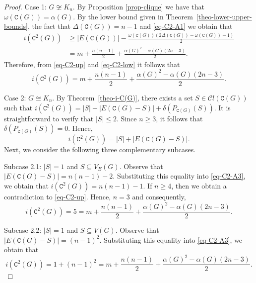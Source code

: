 \documentclass[10pt,a4paper]{amsart}
\begin{document}
\begin{proof}
\noindent
Case 1: $G\not\cong K_n$. By Proposition \ref{prop-clique} we have that $\omega (\mathtt{C}(G)) = \alpha(G)$. By the lower bound given in Theorem~\ref{theo-lower-upper-bounds}, the fact that $\Delta(\mathtt{C}(G)) = n-1$ and \eqref{eq-C2-A1} we obtain that
\begin{equation}\label{eq-C2-low}
\begin{split}
i (\mathtt{C}^{2}(G)) &\geq |E(\mathtt{C}(G))| - \frac{\omega(\mathtt{C}(G))(2\Delta(\mathtt{C}(G))- \omega(\mathtt{C}(G)) -1 )} {2} \\[6pt]
&= m + \frac{n(n-1)}{2} + \frac{\alpha(G)^{2} - \alpha(G) (2n-3)}{2}.
\end{split}
\end{equation}
Therefore, from \eqref{eq-C2-up} and \eqref{eq-C2-low} it follows that
$$i (\mathtt{C}^{2}(G)) = m + \frac{n(n-1)}{2} + \frac{\alpha(G)^{2} - \alpha(G) (2n-3)}{2}.$$

\vspace{.2cm}

\noindent
Case 2: $G \cong K_n$. By Theorem~\ref{theo-i-C(G)}, there exists a set $S \in \mathcal{C}l (\mathtt{C}(G))$ such that 
$i(\mathtt{C}^{2}(G)) = |S| + |E(\mathtt{C}(G)-S)| + \delta(P_{\mathtt{C}(G)}(S))$. It is straightforward to verify that $|S|\leq 2$. Since $n\geq 3$, it follows that $\delta(P_{\mathtt{C}(G)}(S)) = 0$. Hence,
\begin{equation}\label{eq-C2-A3}
i(\mathtt{C}^{2}(G)) = |S| + |E(\mathtt{C}(G)-S)|.
\end{equation}
Next, we consider the following three complementary subcases.

\vspace{.2cm}
		
\noindent
Subcase 2.1: $|S| = 1$ and $S \subseteq V_E(G)$. Observe that $|E(\mathtt{C}(G)-S)| = n(n-1) - 2$. Substituting this equality into \eqref{eq-C2-A3}, we obtain that $i(\mathtt{C}^{2}(G))= n(n-1)-1$.
If $n\geq 4$, then we obtain a contradiction to \eqref{eq-C2-up}. Hence, $n=3$ and consequently, $$i(\mathtt{C}^{2}(G)) = 5 = m + \frac{n(n-1)}{2} + \frac{\alpha(G)^{2} -\alpha(G) (2n-3)}{2}.$$ 

\vspace{.2cm}
	
\noindent
Subcase 2.2: $|S| = 1$ and $S \subseteq V(G)$. Observe that $|E(\mathtt{C}(G)-S)| = (n-1)^{2}$. Substituting this equality into \eqref{eq-C2-A3}, we obtain that
\begin{equation*}
i(\mathtt{C}^{2}(G)) = 1 + (n-1)^{2}=m + \frac{n(n-1)}{2} + \frac{\alpha(G)^{2} -\alpha(G) (2n-3)}{2}.
\end{equation*}


\end{proof}
\end{document}
